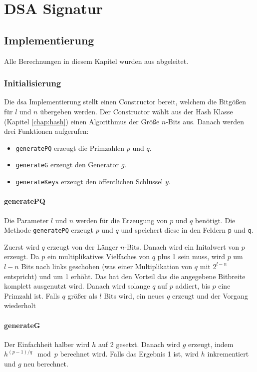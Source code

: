 \chapter{DSA Signatur}

\section{Implementierung}

Alle Berechnungen in diesem Kapitel wurden aus \cite{enwiki:1194947270} abgeleitet.

\subsection{Initialisierung}
Die \gls{dsa} Implementierung stellt einen Constructor bereit, welchem die Bitgößen für $l$ und $n$ übergeben werden. Der Constructor wählt aus der Hash Klasse (Kapitel \ref{chap:hash}) einen Algorithmus der Größe $n$-Bits aus. Danach werden drei Funktionen aufgerufen:
\begin{itemize}
    \item \texttt{generatePQ} erzeugt die Primzahlen $p$ und $q$.
    \item \texttt{generateG} erzeugt den Generator $g$.
    \item \texttt{generateKeys} erzeugt den öffentlichen Schlüssel $y$.
\end{itemize}

\subsubsection{generatePQ}
Die Parameter $l$ und $n$ werden für die Erzeugung von $p$ und $q$ benötigt. Die Methode \texttt{generatePQ} erzeugt $p$ und $q$ und speichert diese in den Feldern \texttt{p} und \texttt{q}.

Zuerst wird $q$ erzeugt von der Länger $n$-Bits. Danach wird ein Initalwert von $p$ erzeugt. Da $p$ ein multiplikatives Vielfaches von $q$ plus 1 sein muss, wird $p$ um $l-n$ Bits nach links geschoben (was einer Multiplikation von $q$ mit $2^{l-n}$ entspricht) und um 1 erhöht. Das hat den Vorteil das die angegebene Bitbreite komplett ausgenutzt wird. Danach wird solange $q$ auf $p$ addiert, bis $p$ eine Primzahl ist.
Falls $q$ größer als $l$ Bits wird, ein neues $q$ erzeugt und der Vorgang wiederholt

\subsubsection{generateG}
Der Einfachheit halber wird $h$ auf 2 gesetzt. Danach wird $g$ erzeugt, indem $h^{(p-1)/q} \mod p$ berechnet wird. Falls das Ergebnis 1 ist, wird $h$ inkrementiert und $g$ neu berechnet.

